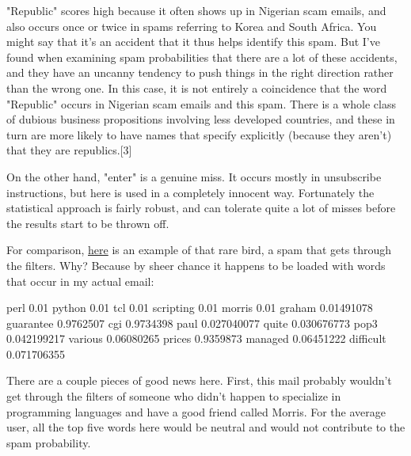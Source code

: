 "Republic" scores high
                    because it often shows up in Nigerian scam emails, and also
                    occurs once or twice in spams referring to Korea and South
                    Africa. You might say that it's an accident that it thus
                    helps identify this spam. But I've found when examining spam
                    probabilities that there are a lot of these accidents, and
                    they have an uncanny tendency to push things in the right
                    direction rather than the wrong one. In this case, it is not
                    entirely a coincidence that the word "Republic" occurs in
                    Nigerian scam emails and this spam. There is a whole class
                    of dubious business propositions involving less developed
                    countries, and these in turn are more likely to have names
                    that specify explicitly (because they aren't) that they are
                    republics.[3]

On the other hand, "enter" is a
                    genuine miss. It occurs mostly in unsubscribe instructions,
                    but here is used in a completely innocent way. Fortunately
                    the statistical approach is fairly robust, and can tolerate
                    quite a lot of misses before the results start to be thrown
                    off.

For comparison,
                    \href{https://sep.turbifycdn.com/ty/cdn/paulgraham/hostexspam.txt?t=1688221954\&}{here}
                    is an example of that rare bird, a spam that gets through
                    the filters. Why? Because by sheer chance it happens to be
                    loaded with words that occur in my actual email:
                    
                      
perl       0.01
python     0.01
tcl        0.01
scripting  0.01
morris     0.01
graham     0.01491078
guarantee  0.9762507
cgi        0.9734398
paul       0.027040077
quite      0.030676773
pop3       0.042199217
various    0.06080265
prices     0.9359873
managed    0.06451222
difficult  0.071706355

                    
                    There are a couple pieces of good news here. First, this
                    mail probably wouldn't get through the filters of someone
                    who didn't happen to specialize in programming languages and
                    have a good friend called Morris. For the average user, all
                    the top five words here would be neutral and would not
                    contribute to the spam probability.

